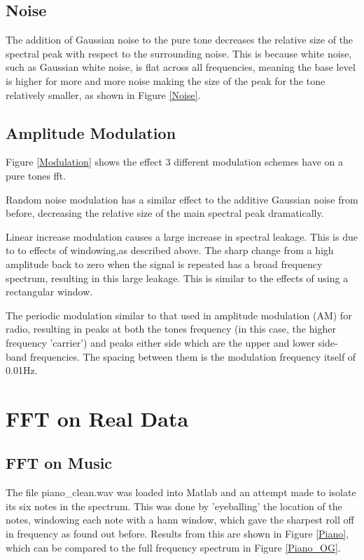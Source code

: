 \documentclass[10.9pt]{article}
\begin{document}
\subsection{Noise}
The addition of Gaussian noise to the pure tone decreases the relative size of the spectral peak with respect to the surrounding noise. This is because white noise, such as Gaussian white noise, is flat across all frequencies, meaning the base level is higher for more and more noise making the size of the peak for the tone relatively smaller, as shown in Figure \ref{Noise}.

\subsection{Amplitude Modulation}
Figure \ref{Modulation} shows the effect 3 different modulation schemes have on a pure tones fft.

Random noise modulation has a similar effect to the additive Gaussian noise from before, decreasing the relative size of the main spectral peak dramatically.

Linear increase modulation  causes a large increase in spectral leakage. This is due to to effects of windowing,as described above. The sharp change from a high amplitude back to zero when the signal is repeated has a broad frequency spectrum, resulting in this large leakage. This is similar to the effects of using a rectangular window.

The periodic  modulation similar to that used in amplitude modulation (AM) for radio, resulting in peaks at both the tones frequency (in this case, the higher frequency 'carrier') and peaks either side which are the upper and lower side-band frequencies. The spacing between them is the modulation frequency itself of 0.01Hz.
\section{FFT on Real Data}
\subsection{FFT on Music}
The file piano\_clean.wav was loaded into Matlab and an attempt made to isolate its six notes in the spectrum. This was done by 'eyeballing' the location of the notes, windowing each note with a hann window, which gave the sharpest roll off in frequency as found out before. Results from this are shown in Figure \ref{Piano}, which can be compared to the full frequency spectrum in Figure \ref{Piano_OG}. 
\end{document}
